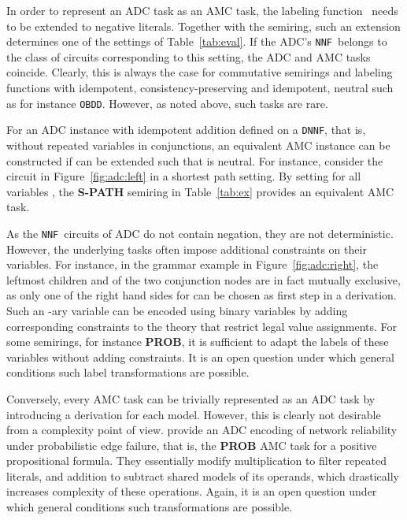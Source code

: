 \documentclass{article}
\theoremstyle{plain}
\theoremstyle{definition}
\newcommand{\NNF}{{\tt NNF}}
\newcommand{\DNNF}{{\tt DNNF}}
\newcommand{\OBDDo}{{\tt OBDD}}
\begin{document}
In order to represent an ADC task as an AMC task, the
labeling function~ needs to be extended to negative
literals. Together with the semiring, such an extension determines one of the
settings of Table~\ref{tab:eval}. If the ADC's \NNF\ belongs to the class of circuits corresponding to this
setting, the ADC and AMC tasks coincide. Clearly, this is always the
case for commutative semirings and labeling functions with idempotent, consistency-preserving
 and idempotent, neutral  such as 
for instance \OBDDo. However, as noted above, such tasks are rare.

For an ADC instance with idempotent addition defined on a \DNNF, that
is, without repeated variables in conjunctions, an
equivalent AMC instance can be constructed if 
can be extended such that  is neutral. For instance, consider the
circuit in Figure~\ref{fig:adc:left} in a shortest path
setting. By setting  for all variables , the \textbf{S-PATH} semiring in Table~\ref{tab:ex} provides an
equivalent AMC task.
 
As the \NNF\ circuits of ADC do not contain negation, they are not 
deterministic. However, the underlying
tasks often impose additional constraints on their variables. For
instance, in the grammar example in Figure~\ref{fig:adc:right}, the leftmost
children  and  of the
two conjunction nodes are in fact mutually exclusive, as only one of
the right hand sides for  can be chosen as first step in a
derivation. Such an -ary variable can be encoded using 
binary variables by adding corresponding constraints to the theory
that restrict legal value assignments. For some semirings,
for instance \textbf{PROB}, it is sufficient to adapt the labels of
these variables without adding constraints. It is an open question under which general
conditions such label transformations are possible.

Conversely, every AMC task can be trivially represented as an ADC task
by introducing a derivation for each model. However, this is clearly
not desirable from a complexity point of view. 
\citet{baras2010path} provide an ADC encoding of network
reliability under probabilistic edge failure, that is, the \textbf{PROB} AMC
task for a positive propositional formula. They essentially modify multiplication to filter repeated literals,
and addition to subtract shared models of its operands, which 
drastically 
increases complexity of these operations. 
Again, it is an open question under which general
conditions such transformations are possible. 
\end{document}
